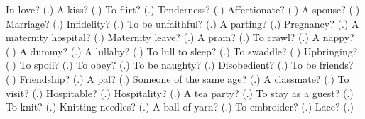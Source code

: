 \begin{tcolorbox}[breakable,colback=teal!4,colframe=teal!35!black,title={Before you move on}]
In love? (\textbf{}.) A kiss? (\textbf{}.) To flirt? (\textbf{}.) Tenderness? (\textbf{}.) Affectionate? (\textbf{}.) A spouse? (\textbf{}.) Marriage? (\textbf{}.) Infidelity? (\textbf{}.) To be unfaithful? (\textbf{}.) A parting? (\textbf{}.) Pregnancy? (\textbf{}.) A maternity hospital? (\textbf{}.) Maternity leave? (\textbf{}.) A pram? (\textbf{}.) To crawl? (\textbf{}.) A nappy? (\textbf{}.) A dummy? (\textbf{}.) A lullaby? (\textbf{}.) To lull to sleep? (\textbf{}.) To swaddle? (\textbf{}.) Upbringing? (\textbf{}.) To spoil? (\textbf{}.) To obey? (\textbf{}.) To be naughty? (\textbf{}.) Disobedient? (\textbf{}.) To be friends? (\textbf{}.) Friendship? (\textbf{}.) A pal? (\textbf{}.) Someone of the same age? (\textbf{}.) A classmate? (\textbf{}.) To visit? (\textbf{}.) Hospitable? (\textbf{}.) Hospitality? (\textbf{}.) A tea party? (\textbf{}.) To stay as a guest? (\textbf{}.) To knit? (\textbf{}.) Knitting needles? (\textbf{}.) A ball of yarn? (\textbf{}.) To embroider? (\textbf{}.) Lace? (\textbf{}.)
\end{tcolorbox}
